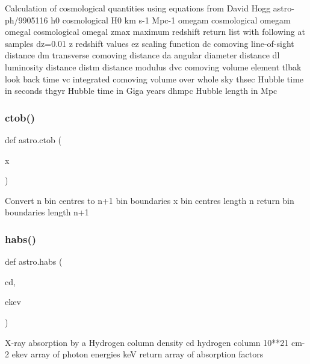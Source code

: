 \begin{DoxyVerb}Calculation of cosmological quantities using equations from David Hogg astro-ph/9905116
    h0     cosmological H0 km s-1 Mpc-1
    omegam cosmological omegam
    omegal cosmological omegal
    zmax   maximum redshift
return list with following at samples dz=0.01
    z      redshift values
    ez     scaling function
    dc     comoving line-of-sight distance
    dm     transverse comoving distance
    da     angular diameter distance
    dl     luminosity distance
    distm  distance modulus
    dvc    comoving volume element
    tlbak  look back time
    vc     integrated comoving volume over whole sky
    thsec  Hubble time in seconds
    thgyr  Hubble time in Giga years
    dhmpc  Hubble length in Mpc
\end{DoxyVerb}
 \mbox{\label{namespaceastro_a214f13a490e598ad3f9a73eaa5a0c522}} 
\subsubsection{\texorpdfstring{ctob()}{ctob()}}
{\footnotesize\ttfamily def astro.\+ctob (\begin{DoxyParamCaption}\item[{}]{x }\end{DoxyParamCaption})}

\begin{DoxyVerb}Convert n bin centres to n+1 bin boundaries
    x      bin centres length n
return bin boundaries length n+1
\end{DoxyVerb}
 \mbox{\label{namespaceastro_a2affbbac80a8c00684373d8ccb26ef26}} 
\subsubsection{\texorpdfstring{habs()}{habs()}}
{\footnotesize\ttfamily def astro.\+habs (\begin{DoxyParamCaption}\item[{}]{cd,  }\item[{}]{ekev }\end{DoxyParamCaption})}

\begin{DoxyVerb}X-ray absorption by a Hydrogen column density
    cd      hydrogen column 10**21 cm-2
    ekev    array of photon energies keV
return  array of absorption factors
\end{DoxyVerb}
 \mbox{\label{namespaceastro_a6d5632e077159fa53d0bd70d4a288c8a}} 
